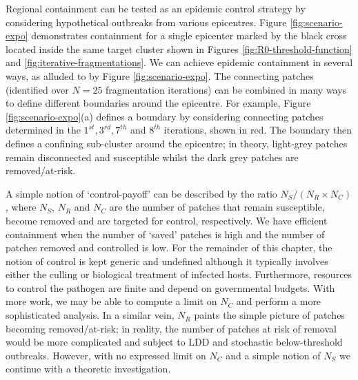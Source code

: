 Regional containment can be tested as an epidemic control strategy by considering hypothetical outbreaks from various epicentres. 
Figure \ref{fig:scenario-expo} demonstrates containment for a single epicenter marked by the black cross\textemdash 
located inside the same target cluster shown in Figures \ref{fig:R0-threshold-function} and \ref{fig:iterative-fragmentations}.
We can achieve epidemic containment in several ways, as alluded to by Figure \ref{fig:scenario-expo}.
The connecting patches (identified over $N=25$ fragmentation iterations) can be combined in many ways to define different boundaries around the epicentre.
For example, Figure \ref{fig:scenario-expo}(a) defines a boundary by considering connecting patches determined in the $1^{st}, 3^{rd}, 7^{th}$ and $8^{th}$ iterations, shown in red.
The boundary then defines a confining sub-cluster around the epicentre; 
in theory, light-grey patches remain disconnected and susceptible whilst the dark grey patches are removed/at-risk.

A simple notion of `control-payoff' can be described by the ratio $N_{S}/(N_{R}\times N_{C})$,
where $N_S$, $N_{R}$ and $N_{C}$ are the number of patches that remain susceptible, become removed and are targeted for control, respectively.
We have efficient containment when the number of `saved' patches is high and the number of patches removed and controlled is low.
For the remainder of this chapter, the notion of control is kept generic and undefined\textemdash
although it typically involves either the culling or biological treatment of infected hosts.
Furthermore, resources to control the pathogen are finite and depend on governmental budgets.
With more work, we may be able to compute a limit on $N_{C}$ and perform a more sophisticated analysis.
In a similar vein, $N_R$ paints the simple picture of patches becoming removed/at-risk; 
in reality, the number of patches at risk of removal would be more complicated and subject to LDD and stochastic below-threshold outbreaks. 
However, with no expressed limit on $N_{C}$ and a simple notion of $N_S$ we continue with a theoretic investigation.


